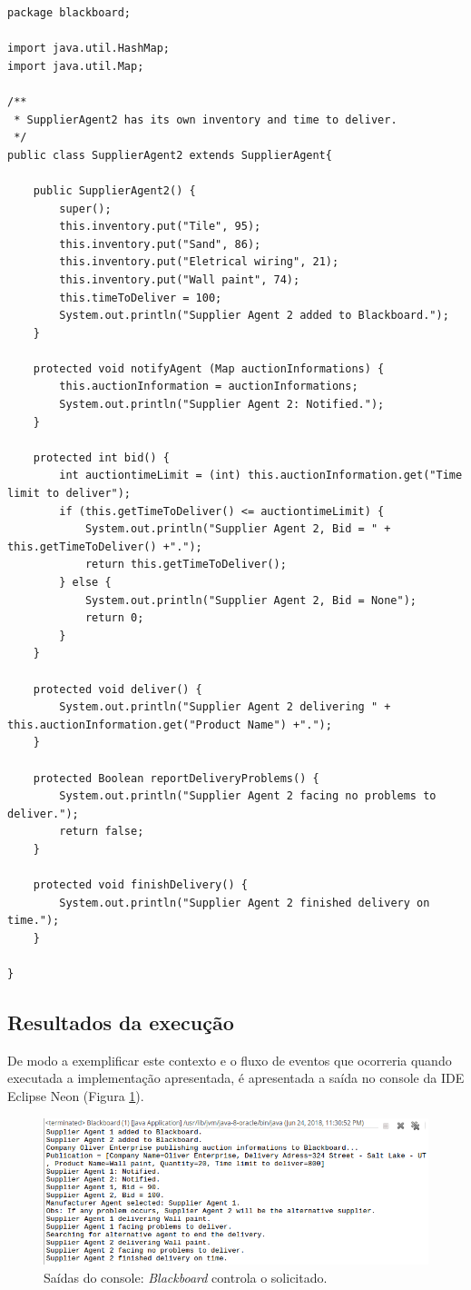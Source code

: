 \begin{lstlisting}
package blackboard;

import java.util.HashMap;
import java.util.Map;

/**
 * SupplierAgent2 has its own inventory and time to deliver.
 */
public class SupplierAgent2 extends SupplierAgent{
	
	public SupplierAgent2() {
		super();
		this.inventory.put("Tile", 95);
		this.inventory.put("Sand", 86);
		this.inventory.put("Eletrical wiring", 21);
		this.inventory.put("Wall paint", 74);
		this.timeToDeliver = 100;
		System.out.println("Supplier Agent 2 added to Blackboard.");
	}
	
	protected void notifyAgent (Map auctionInformations) {
		this.auctionInformation = auctionInformations;
		System.out.println("Supplier Agent 2: Notified.");
	}
	
	protected int bid() {
		int auctiontimeLimit = (int) this.auctionInformation.get("Time limit to deliver");
		if (this.getTimeToDeliver() <= auctiontimeLimit) {
			System.out.println("Supplier Agent 2, Bid = " + this.getTimeToDeliver() +".");
			return this.getTimeToDeliver();
		} else {
			System.out.println("Supplier Agent 2, Bid = None");
			return 0;
		}
	}
	
	protected void deliver() {
		System.out.println("Supplier Agent 2 delivering " + this.auctionInformation.get("Product Name") +".");
	}
	
	protected Boolean reportDeliveryProblems() {
		System.out.println("Supplier Agent 2 facing no problems to deliver.");
		return false;
	}
	
	protected void finishDelivery() {
		System.out.println("Supplier Agent 2 finished delivery on time.");
	}
	
}
\end{lstlisting}

\subsection{Resultados da execução}

De modo a exemplificar este contexto e o fluxo de eventos que ocorreria quando executada a implementação apresentada, é apresentada a saída no console da IDE Eclipse Neon (Figura \ref{fig:blackboard_console}).

\begin{figure}[!h]
\centering
\includegraphics[scale=0.6]{figuras/blackboard/blackboard_console.png}
\caption{Saídas do console: \textit{Blackboard} controla o                            solicitado.}
\label{fig:blackboard_console}
\end{figure}